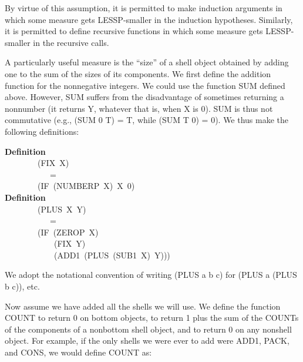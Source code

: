 \documentclass[10pt]{book}
\newenvironment{pubasis}{\begin{flushleft}}{\end{flushleft}}
\newcommand{\axiomordefinition}[1]{\vspace{6pt}\Large\textsf{\textbf{#1}}\normalsize}
\begin{document}
\hrulefill 

By virtue of this assumption, it is permitted to make
induction arguments in which some measure
gets LESSP-smaller in the induction hypotheses.
Similarly, it is permitted to define recursive functions
in which some measure gets LESSP-smaller in the recursive calls.

A particularly useful measure is the ``size'' of a shell object 
obtained by adding one to the sum of the sizes of its components.
We first define the addition function for the
nonnegative integers.  We could use the function SUM
defined above.
However, SUM suffers from
the disadvantage of sometimes returning a nonnumber  (it returns Y, whatever
that is, when X is 0).  SUM is thus not commutative
(e.g., (SUM 0 T) = T, while (SUM T 0) = 0).  We thus make the following definitions:

\hrulefill 

\begin{pubasis}
\axiomordefinition{Definition}\\
~~~~~~~~(FIX~X)\\
~~~~~~~~~~~=\\
~~~~~~~~(IF~(NUMBERP~X)~X~0)\\

\axiomordefinition{Definition}\\
~~~~~~~~(PLUS~X~Y)\\
~~~~~~~~~~~=\\
~~~~~~~~(IF~(ZEROP~X)\\
~~~~~~~~~~~~(FIX~Y)\\
~~~~~~~~~~~~(ADD1~(PLUS~(SUB1~X)~Y)))\\
\end{pubasis}
We adopt the notational convention of writing (PLUS a b c) for (PLUS a (PLUS b c)), etc.

Now assume  we have added all the shells  we will
use.  We define the function COUNT to return 0 on
bottom objects, to return 1 plus the sum of the COUNTs
of the components of a nonbottom  shell object, and to
return 0 on any nonshell object.  For example, if the only
shells we were ever to add were ADD1, PACK, and CONS, we
would define COUNT as:
\end{document}
